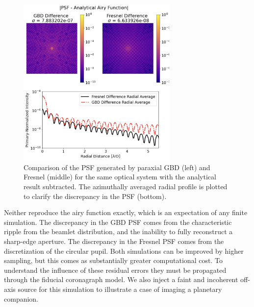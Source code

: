 \begin{figure}[H]
    \centering
    \includegraphics[width=0.7\textwidth]{paraxial_psf_record_9200wo.png}
    \caption{Comparison of the PSF generated by paraxial GBD (left) and Fresnel (middle) for the same optical system with the analytical result subtracted. The azimuthally averaged radial profile is plotted to clarify the discrepancy in the PSF (bottom). }
    \label{fig:paraxial_psfs}
\end{figure}

Neither reproduce the airy function exactly, which is an expectation of any finite simulation. The discrepancy in the GBD PSF comes from the characteristic ripple from the beamlet distribution, and the inability to fully reconstruct a sharp-edge aperture. The discrepancy in the Fresnel PSF comes from the discretization of the circular pupil. Both simulations can be improved by higher sampling, but this comes as substantially greater computational cost. To understand the influence of these residual errors they must be propagated through the fiducial coronagraph model. We also inject a faint and incoherent off-axis source for this simulation to illustrate a case of imaging a planetary companion. 



